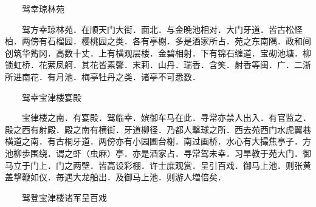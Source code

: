 　　驾幸琼林苑

　　驾方幸琼林苑．在顺天门大街．面北．与金晩池相对．大门牙道．皆古松怪柏．两傍有石榴园．樱桃园之类．各有亭榭．多是酒家所占．苑之东南隅．政和间创筑华觜冈．高数十丈．上有横观层楼．金碧相射．下有锦石缠道．宝砌池塘．柳锁虹桥．花萦凤舸．其花皆素馨．末莉．山丹．瑞香．含笑．射香等闽．广．二浙所进南花．有月池．梅亭牡丹之类．诸亭不可悉数．

　　驾幸宝津楼宴殿

　　宝律楼之南．有宴殿．驾临幸．嫔御车马在此．寻常亦禁人出入．有官监之．殿之西有射殿．殿之南有横街．牙道柳径．乃都人撃球之所．西去苑西门水虎翼巷横道之南．有古桐牙道．两傍亦有小园圃台榭．南过画桥．水心有大撮焦亭子．方池柳歩围绕．谓之虾（虫麻）亭．亦是酒家占．寻常驾未幸．习旱教于苑大门．御马立于门上．门之两壁．皆高设彩棚．许士庶观赏．呈引百戏．御马上池．则张黄盖撃鞭如仪．毎遇大龙船出．及御马上池．则游人増倍矣．

　　驾登宝津楼诸军呈百戏

